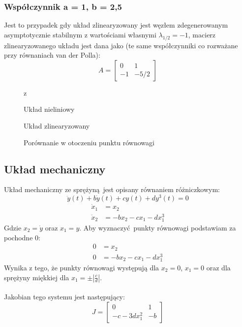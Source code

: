 \documentclass[a4paper, 10pt]{article}
\begin{document}
			\subsubsection{Współczynnik a = 1, b = 2,5}
					Jest to przypadek gdy układ zlinearyzowany jest węzłem zdegenerowanym asymptotycznie stabilnym z wartościami własnymi $\lambda_{1/2} =-1$, macierz zlinearyzowanego układu jest dana jako (te same współczynniki co rozważane przy równaniach van der Polla):
					$$
						A = \begin{bmatrix}
							0 & 1 \\
							-1  & -5/2
						\end{bmatrix}
					$$
				\begin{figure}[H]
					\centering
					\def \svgwidth{0.8\columnwidth}z
					
					\caption{Układ nieliniowy}
				\end{figure}\noindent


				\begin{figure}[H]
					\centering
					\def \svgwidth{0.8\columnwidth}
					
					\caption{Układ zlinearyzowany}
				\end{figure}\noindent


				\begin{figure}[H]
					\centering
					\def \svgwidth{0.8\columnwidth}
					
					\caption{Porównanie w otoczeniu punktu równowagi}
				\end{figure}\noindent

		\subsection{Układ mechaniczny}
			Układ mechaniczny ze sprężyną jest opisany równaniem różniczkowym:
			$$
				\ddot{y}(t) + b\dot{y}(t) + cy(t) + d y^3(t) = 0
			$$
			$$
				\begin{aligned}
					\dot{x}_1 & = x_2\\
					\dot{x}_2 & = -b x_2 - c x_1 - d x_1^3
				\end{aligned}
			$$
			Gdzie $x_2 = \dot{y}$ oraz $x_1 = y$. Aby wyznaczyć punkty równowagi podstawiam za pochodne 0:
			$$
				\begin{aligned}
					0 & = x_2\\
					0 & = -b x_2 - c x_1 - d x_1^3
				\end{aligned}
			$$
			Wynika z tego, że punkty równowagi występują dla $x_2 = 0$, $x_1 = 0$ oraz dla sprężyny miękkiej dla $x_1 = \pm \left|\frac{c}{d}\right|$. \\\\
			Jakobian tego systemu jest następujący:
			$$
				J = \begin{bmatrix}
					0 & 1 \\
					-c - 3dx_1^2 & -b
				\end{bmatrix}
			$$
\end{document}
